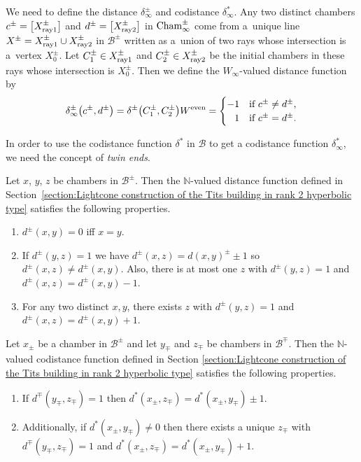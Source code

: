 \documentclass[pdftex]{sigma}
\numberwithin{equation}{section}
\def\N{\mathbb{N}}
\def\cB{\mathcal B}
\begin{document}
We need to define the distance $\delta_\infty^\pm$ and codistance $\delta_\infty^*$.
Any two distinct chambers $c^\pm = \big[X_{\rm ray1}^\pm\big]$ and $d^\pm = \big[X_{\rm ray2}^\pm\big]$ in ${\rm Cham}_\infty^\pm$ come from a~unique line
$X^\pm = X_{\rm ray1}^\pm\cup X_{\rm ray2}^\pm$ in $\cB^\pm$ written as a~union of two rays whose intersection is a~vertex $X_0^\pm$.
Let $C_1^\pm\in X_{\rm ray1}^\pm$ and $C_2^\pm\in X_{\rm ray2}^\pm$ be the initial chambers in these rays whose intersection is
$X_0^\pm$.
Then we define the $W_{\infty}$-valued distance function by
\[\delta_\infty^\pm\big(c^\pm, d^\pm\big) = \delta^\pm\big(C_1^\pm,C_2^\pm\big)W^{\rm even} = \begin{cases} -1& \hbox{if }c^\pm\neq d^\pm, \\
\hphantom{-}1& \hbox{if }c^\pm = d^\pm. \end{cases} \]

In order to use the codistance function $\delta^*$ in $\cB$ to get a codistance function $\delta_\infty^*$,
we need the concept of {\it twin ends}.

Let $x$, $y$, $z$ be chambers in $\cB^\pm$. Then the $\N$-valued distance function defined in
Section~\ref{section:Lightcone construction of the Tits building in rank 2 hyperbolic type}
satisfies the following properties.
\begin{enumerate}\itemsep=0pt
\item $d^\pm(x,y) = 0$ iff $x=y$.
\item If $d^\pm(y,z)=1$ we have $d^\pm(x,z) = d(x,y)^\pm \pm 1$ so $d^\pm(x,z) \neq d^\pm(x,y)$.
Also, there is at most one $z$ with $d^\pm(y,z) = 1$ and $d^\pm(x,z) = d^\pm(x,y) - 1$.
\item For any two distinct $x,y$, there exists $z$ with $d^\pm(y,z) = 1$ and $d^\pm(x,z) = d^\pm(x,y) + 1$.
\end{enumerate}
Let $x_\pm$ be a chamber in $\cB^\pm$ and let $y_\mp$ and $z_\mp$ be chambers in $\cB^\mp$. Then the $\N$-valued codistance
function defined in Section \ref{section:Lightcone construction of the Tits building in rank 2 hyperbolic type}
satisfies the following properties.

\begin{enumerate}\itemsep=0pt
\item If $d^\mp(y_\mp,z_\mp) = 1$ then $d^*(x_\pm,z_\mp) = d^*(x_\pm,y_\mp) \pm 1$.
\item Additionally, if $d^*(x_\pm,y_\mp)\neq 0$ then there exists a unique $z_\mp$ with $d^\mp(y_\mp,z_\mp) = 1$ and
$d^*(x_\pm,z_\mp) = d^*(x_\pm,y_\mp) + 1$.
\end{enumerate}
\end{document}
